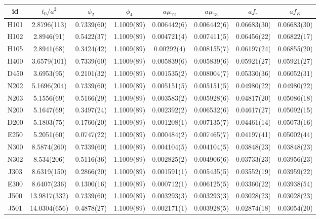 \begin{sidewaystable}
\begin{center}
    \begin{tabular}{c c c c c c c c}
id & $t_0/a^2$ & $\phi_2$ & $\phi_4$ & $a\mu_{12}$ & $a\mu_{13}$ & $af_{\pi}$ & $af_K$ \\
\toprule
H101 & 2.8796(113) & 0.7339(60) & 1.1009(89) & 0.006442(6) & 0.006442(6) & 0.06683(30) & 0.06683(30) \\
H102 & 2.8946(91) & 0.5422(37) & 1.1009(89) & 0.004721(4) & 0.007411(5) & 0.06456(22) & 0.06822(17) \\
H105 & 2.8941(68) & 0.3424(42) & 1.1009(89) & 0.00292(4) & 0.008155(7) & 0.06197(24) & 0.06855(20) \\
\midrule
H400 & 3.6579(101) & 0.7339(60) & 1.1009(89) & 0.005839(6) & 0.005839(6) & 0.05921(27) & 0.05921(27) \\
D450 & 3.6953(95) & 0.2101(32) & 1.1009(89) & 0.001535(2) & 0.008004(7) & 0.05330(36) & 0.06052(31) \\
\midrule
N202 & 5.1696(204) & 0.7339(60) & 1.1009(89) & 0.005151(5) & 0.005151(5) & 0.04980(22) & 0.04980(22) \\
N203 & 5.1556(69) & 0.5166(29) & 1.1009(89) & 0.003583(2) & 0.005928(6) & 0.04817(20) & 0.05086(18) \\
N200 & 5.1647(69) & 0.3497(24) & 1.1009(89) & 0.002392(2) & 0.006532(6) & 0.04617(27) & 0.05092(15) \\
D200 & 5.1803(75) & 0.1760(20) & 1.1009(89) & 0.001208(1) & 0.007135(7) & 0.04461(14) & 0.05073(16) \\
E250 & 5.2051(60) & 0.0747(22) & 1.1009(89) & 0.000484(2) & 0.007465(7) & 0.04197(41) & 0.05002(44) \\
\midrule
N300 & 8.5874(260) & 0.7339(60) & 1.1009(89) & 0.004104(5) & 0.004104(5) & 0.03848(23) & 0.03848(23) \\
N302 & 8.534(206) & 0.5116(36) & 1.1009(89) & 0.002825(2) & 0.004906(6) & 0.03733(23) & 0.03956(23) \\
J303 & 8.6319(150) & 0.2866(20) & 1.1009(89) & 0.001591(1) & 0.005435(5) & 0.03552(19) & 0.03959(22) \\
E300 & 8.6407(236) & 0.1300(16) & 1.1009(89) & 0.000712(1) & 0.006125(5) & 0.03360(22) & 0.03938(54) \\
\midrule
J500 & 13.9817(332) & 0.7339(60) & 1.1009(89) & 0.003293(3) & 0.003293(3) & 0.03028(23) & 0.03028(23) \\
J501 & 14.0304(656) & 0.4878(27) & 1.1009(89) & 0.002171(1) & 0.003928(5) & 0.02874(18) & 0.03054(20) \\

\end{tabular}
\end{center}
\end{sidewaystable}
